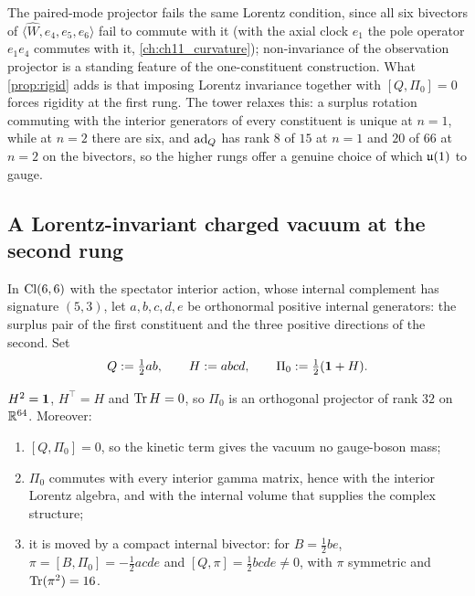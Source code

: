 The paired-mode projector fails the same Lorentz condition, since all six bivectors of $\langle\widehat W,e_4,e_5,e_6\rangle$ fail to commute with it (with the axial clock $e_1$ the pole operator $e_1e_4$ commutes with it, \cref{ch:ch11_curvature}); non-invariance of the observation projector
is a standing feature of the one-constituent construction. What \cref{prop:rigid} adds is that imposing Lorentz invariance together with $[Q,\Pi_0]=0$ forces rigidity
at the first rung. The tower relaxes this: a surplus rotation commuting with the interior generators of every constituent is unique at $n=1$, while at $n=2$ there are
six, and $\operatorname{ad}_Q$ has rank $8$ of $15$ at $n=1$ and $20$ of $66$ at $n=2$ on the bivectors, so the higher rungs offer a genuine choice of which $\mathfrak{u}(1)$ to gauge.

\subsection{A Lorentz-invariant charged vacuum at the second rung}
\label{sec:towervac}

\begin{definition}
\label{def:towervac}
In $\mathrm{Cl}(6,6)$ with the spectator interior action, whose internal complement has signature $(5,3)$, let $a,b,c,d,e$ be orthonormal positive internal generators: the
surplus pair of the first constituent and the three positive directions of the second. Set
\[
Q:=\tfrac12ab,\qquad H:=abcd,\qquad \Pi_0:=\tfrac12(\mathbf 1+H).
\]
\end{definition}

\begin{theorem}
\label{thm:towervac}
$H^2=\mathbf 1$, $H^{\!\top}=H$ and $\operatorname{Tr} H=0$, so $\Pi_0$ is an orthogonal projector of rank $32$ on $\mathbb{R}^{64}$. Moreover:
\begin{enumerate}[label=(\roman*),leftmargin=2.2em]
\item $[Q,\Pi_0]=0$, so the kinetic term gives the vacuum no gauge-boson mass;
\item $\Pi_0$ commutes with every interior gamma matrix, hence with the interior Lorentz algebra, and with the internal volume that supplies the complex structure;
\item it is moved by a compact internal bivector: for $B=\tfrac12be$, $\pi=[B,\Pi_0]=-\tfrac12acde$ and $[Q,\pi]=\tfrac12bcde\neq0$, with $\pi$ symmetric and $\operatorname{Tr}(\pi^2)=16$.
\end{enumerate}
\end{theorem}


